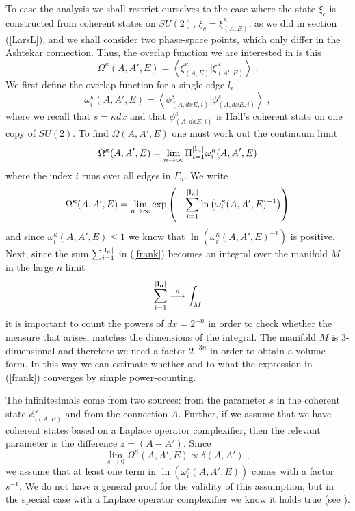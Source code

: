 \documentclass[12pt]{article}
\def\d{\delta}
\def\oo{\omega}
\def\G{\Gamma}
\def\OO{\Omega}
\def\P{\Pi}
\begin{document}
To ease the analysis we shall restrict ourselves to the case where the state $\xi_c$ is constructed from coherent states on $SU(2)$, $\xi_c=\xi^{\kappa}_{(A,E)}$, as we did in section (\ref{LarsL}), and we shall consider two phase-space points, which only differ in the Ashtekar connection.
Thus, the overlap function we are interested in is this
$$
\OO^{\kappa}(A,A',E)  = \left\langle \xi^{\kappa}_{(A,E)} \vert \xi^{\kappa }_{(A',E)}  \right\rangle \;.
$$
We first define the overlap function for a single edge $l_i$ 
$$
\oo^{\kappa}_i(A,A',E) = \left\langle \phi^s_{(A,dxE,i)} \vert \phi^s_{(A,dxE,i)}  \right\rangle \;,
$$
where we recall that $s= \kappa dx$ and that $\phi^s_{(A,dxE,i)} $ is Hall's coherent state on one copy of $SU(2)$.
To find $\OO(A,A',E) $ one must work out the continuum limit
$$
\OO^\kappa(A,A',E)  = \lim_{n\rightarrow \infty} \P_{i=1}^{\vert {\bf l}_n \vert} \oo^\kappa_i(A,A',E)
$$
where the index $i$ runs over all edges in $\G_n$. 
We write
\begin{equation}
\OO^{\kappa}(A,A',E)  =  \lim_{n\rightarrow \infty} \exp\left( - \sum_{i=1}^{\vert {\bf l}_n \vert}  \ln \left(\oo^\kappa_i(A,A',E)^{-1} \right)    \right) 
\label{frank}
\end{equation}
and since $\oo^\kappa_i(A,A',E)\leq 1$ we know that $\ln \left(\oo^\kappa_i(A,A',E)^{-1} \right) $ is positive.
%
%
%
Next, since the sum $\sum_{i=1}^{\vert {\bf l}_n \vert}$ in (\ref{frank}) becomes an integral over the manifold $M$ in the large $n$ limit
$$
\sum_{i=1}^{\vert \bf{l}_n \vert} \stackrel{n}{\longrightarrow} \int_M
$$
it is important to count the powers of $dx=2^{-n}$ in order to check whether the measure that arises, matches the dimensions of the integral. The manifold $M$ is 3-dimensional and therefore we need a factor $2^{-3n}$ in order to obtain a volume form. In this way we can estimate whether and to what the expression in (\ref{frank}) converges by simple power-counting. 

The infinitesimals come from two sources: from the parameter $s$ in the coherent state $\phi^s_{i(A,E)}$ and from the connection $A$. Further, if we assume that we have coherent states based on a Laplace operator complexifier, then the relevant parameter is the difference $z= (A-A')$. 
Since
$$
\lim_{s\rightarrow 0}\OO^\kappa(A,A',E) \propto \d(A,A') \;,
$$ 
we assume that at least one term in $\ln \left(\oo^s_i(A,A',E) \right) $ comes with a factor $s^{-1}$.
We do not have a general proof for the validity of this assumption, but in the special case with a Laplace operator complexifier we know it holds true (see \cite{Thiemann:2000ca}).
\end{document}
